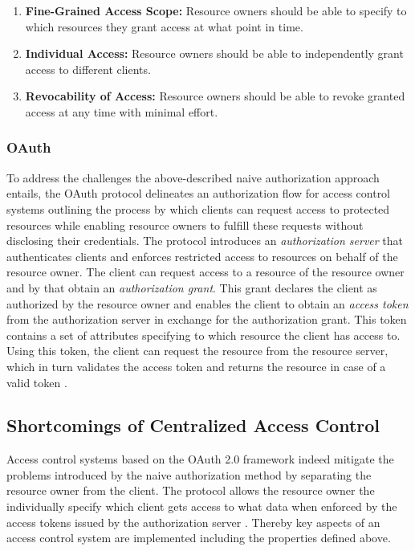 \documentclass[conference]{IEEEtran}
\begin{document}
\begin{enumerate}
  \item \textbf{Fine-Grained Access Scope:} Resource owners should be able to specify to which resources they grant access at what point in time.
  \item \textbf{Individual Access:} Resource owners should be able to independently grant access to different clients.
  \item \textbf{Revocability of Access:} Resource owners should be able to revoke granted access at any time with minimal effort.
\end{enumerate}

\subsubsection*{OAuth}
To address the challenges the above-described naive authorization approach entails, the OAuth protocol delineates an authorization flow for access control systems outlining the process by which clients can request access to protected resources while enabling resource owners to fulfill these requests without disclosing their credentials.
The protocol introduces an \textit{authorization server} that authenticates clients and enforces restricted access to resources on behalf of the resource owner.
The client can request access to a resource of the resource owner and by that obtain an \textit{authorization grant}.
This grant declares the client as authorized by the resource owner and enables the client to obtain an \textit{access token} from the authorization server in exchange for the authorization grant.
This token contains a set of attributes specifying to which resource the client has access to.
Using this token, the client can request the resource from the resource server, which in turn validates the access token and returns the resource in case of a valid token \cite{hardt_oauth_2012}.

\subsection{Shortcomings of Centralized Access Control}
\label{sec:shortcomings}
Access control systems based on the OAuth 2.0 framework indeed mitigate the problems introduced by the naive authorization method by separating the resource owner from the client.
The protocol allows the resource owner the individually specify which client gets access to what data when enforced by the access tokens issued by the authorization server \cite{hardt_oauth_2012}.
Thereby key aspects of an access control system are implemented including the properties defined above.
\end{document}
